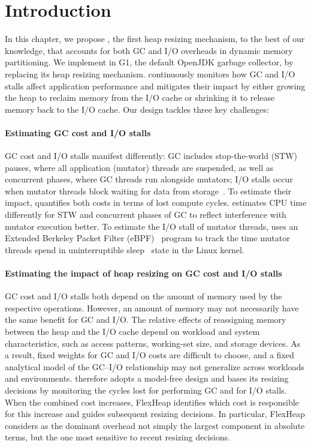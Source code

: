 \section{Introduction}

In this chapter, we propose \flexheapName{}, the first heap resizing mechanism, to the best of our knowledge, that accounts for both GC and I/O overheads in dynamic memory partitioning.
We implement \flexheapName{} in G1, the default OpenJDK garbage collector, by replacing its heap resizing mechanism.
\flexheapName{} continuously monitors how GC and I/O stalls affect application performance and mitigates their impact by either growing the heap to reclaim memory from the I/O cache or shrinking it to release memory back to the I/O cache.
Our design tackles three key challenges:

\paragraph{\textbf{Estimating GC cost and I/O stalls}}
GC cost and I/O stalls manifest differently: GC includes stop-the-world (STW) pauses, where all application (mutator) threads are suspended, as well as concurrent phases, where GC threads run alongside mutators; I/O stalls occur when mutator threads block waiting for data from storage~\cite{kernel:sleeping}.
To estimate their impact, \flexheapName{} quantifies both costs in terms of lost compute cycles.
\flexheapName{} estimates CPU time differently for STW and concurrent phases of GC to reflect interference with mutator execution better.
To estimate the I/O stall of mutator threads, \flexheapName{} uses an Extended Berkeley Packet Filter (eBPF)~\cite{ebpf} program to track the time mutator threads spend in uninterruptible sleep~\cite{kernel:sleeping} state in the Linux kernel.

\paragraph{\textbf{Estimating the impact of heap resizing on GC cost and I/O stalls}}
GC cost and I/O stalls both depend on the amount of memory used by the respective operations.
However, an amount of memory may not necessarily have the same benefit for GC and I/O.
The relative effects of reassigning memory between the heap and the I/O cache depend on workload and system characteristics, such as access patterns, working-set size, and storage devices.
As a result, fixed weights for GC and I/O costs are difficult to choose, and a fixed analytical model of the GC--I/O relationship may not generalize across workloads and environments.
\flexheapName{} therefore adopts a model-free design and bases its resizing decisions by monitoring the cycles lost for performing GC and for I/O stalls.
When the combined cost increases, FlexHeap identifies which cost is responsible for this increase and guides subsequent resizing decisions.
In particular, FlexHeap considers as the dominant overhead not simply the largest component in absolute terms, but the one most sensitive to recent resizing decisions.

